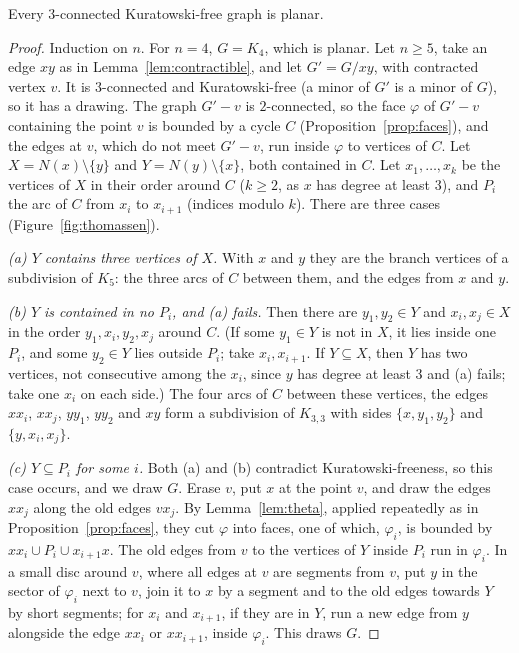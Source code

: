 \begin{lemma}\label{lem:threeconn}
Every $3$-connected Kuratowski-free graph is planar.
\end{lemma}
\begin{proof}
Induction on $n$. For $n=4$, $G=K_4$, which is planar. Let $n\ge5$, take an edge $xy$ as in Lemma~\ref{lem:contractible}, and let $G'=G/xy$, with contracted vertex $v$.
It is $3$-connected and Kuratowski-free (a minor of $G'$ is a minor of $G$), so it has a drawing. The graph $G'-v$ is $2$-connected, so the face $\varphi$ of $G'-v$ containing
the point $v$ is bounded by a cycle $C$ (Proposition~\ref{prop:faces}), and the edges at $v$, which do not meet $G'-v$, run inside $\varphi$ to vertices of $C$. Let
$X=N(x)\setminus\{y\}$ and $Y=N(y)\setminus\{x\}$, both contained in $C$. Let $x_1,\dots,x_k$ be the vertices of $X$ in their order around $C$ ($k\ge2$, as $x$ has degree at least $3$), and
$P_i$ the arc of $C$ from $x_i$ to $x_{i+1}$ (indices modulo $k$). There are three cases (Figure~\ref{fig:thomassen}).

\emph{(a) $Y$ contains three vertices of $X$.} With $x$ and $y$ they are the branch vertices of a subdivision of $K_5$: the three arcs of $C$ between them, and the
edges from $x$ and $y$.

\emph{(b) $Y$ is contained in no $P_i$, and (a) fails.} Then there are $y_1,y_2\in Y$ and $x_i,x_j\in X$ in the order $y_1,x_i,y_2,x_j$ around $C$. (If some $y_1\in Y$ is not in $X$, it lies inside one
$P_i$, and some $y_2\in Y$ lies outside $P_i$; take $x_i,x_{i+1}$. If $Y\subseteq X$, then $Y$ has two vertices, not consecutive among the $x_i$, since $y$ has degree at least $3$
and (a) fails; take one $x_i$ on each side.) The four arcs of $C$ between these vertices, the edges $xx_i$, $xx_j$, $yy_1$, $yy_2$ and $xy$ form a subdivision of $K_{3,3}$
with sides $\{x,y_1,y_2\}$ and $\{y,x_i,x_j\}$.

\emph{(c) $Y\subseteq P_i$ for some $i$.} Both (a) and (b) contradict Kuratowski-freeness, so this case occurs, and we draw $G$. Erase $v$, put $x$ at the
point $v$, and draw the edges $xx_j$ along the old edges $vx_j$. By Lemma~\ref{lem:theta}, applied repeatedly as in Proposition~\ref{prop:faces}, they cut $\varphi$ into faces,
one of which, $\varphi_i$, is bounded by $xx_i\cup P_i\cup x_{i+1}x$. The old edges from $v$ to the vertices of $Y$ inside $P_i$ run in $\varphi_i$. In a small disc around $v$, where all
edges at $v$ are segments from $v$, put $y$ in the sector of $\varphi_i$ next to $v$, join it to $x$ by a segment and to the old edges towards $Y$ by short
segments; for $x_i$ and $x_{i+1}$, if they are in $Y$, run a new edge from $y$ alongside the edge $xx_i$ or $xx_{i+1}$, inside $\varphi_i$. This draws $G$.
\end{proof}

